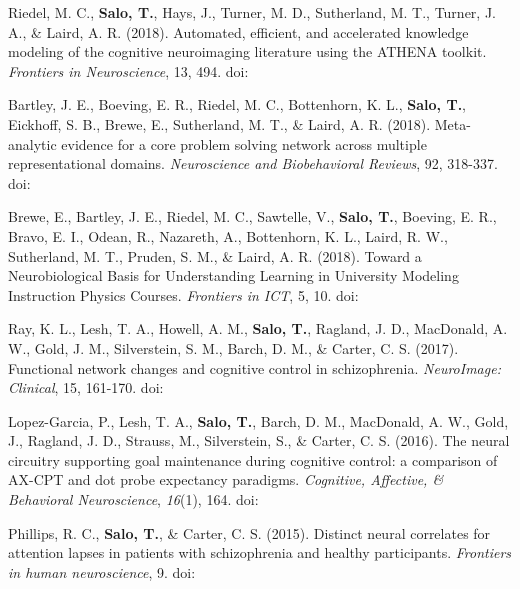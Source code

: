 \documentclass[10pt]{article}
\newcommand{\textlink}[3][blue]{\href{#2}{\color{#1}{#3}}}
\begin{document}
\begin{hangparas}{.25in}{1}

	Riedel, M. C., \textbf{Salo, T.}, Hays, J., Turner, M. D., Sutherland, M. T.,
	Turner, J. A., \& Laird, A. R. (2018).
	Automated, efficient, and accelerated knowledge modeling of the cognitive
	neuroimaging literature using the ATHENA toolkit.
	\emph{Frontiers in Neuroscience}, 13, 494.
	doi:\textlink{https://doi.org/10.3389/fnins.2019.00494}{10.3389/fnins.2019.00494}

	\bigskip

	Bartley, J. E., Boeving, E. R., Riedel, M. C., Bottenhorn, K. L.,
	\textbf{Salo, T.}, Eickhoff, S. B., Brewe, E., Sutherland, M. T.,
	\& Laird, A. R. (2018).
	Meta-analytic evidence for a core problem solving network across multiple
	representational domains. \emph{Neuroscience and Biobehavioral Reviews}, 92, 318-337.
	doi:\textlink{https://doi.org/10.1016/j.neubiorev.2018.06.009}{10.1016/j.neubiorev.2018.06.009}

	\bigskip

	Brewe, E., Bartley, J. E., Riedel, M. C., Sawtelle, V., \textbf{Salo, T.},
	Boeving, E. R., Bravo, E. I., Odean, R., Nazareth, A., Bottenhorn, K. L.,
	Laird, R. W., Sutherland, M. T., Pruden, S. M., \& Laird, A. R. (2018).
	Toward a Neurobiological Basis for Understanding Learning in University Modeling
	Instruction Physics Courses. \emph{Frontiers in ICT}, 5, 10.
	doi:\textlink{https://doi.org/10.3389/fict.2018.00010}{10.3389/fict.2018.00010}

	\bigskip

	Ray, K. L., Lesh, T. A., Howell, A. M., \textbf{Salo, T.}, Ragland, J. D.,
	MacDonald, A. W., Gold, J. M., Silverstein, S. M., Barch, D. M., \& Carter,
	C. S. (2017). Functional network changes and cognitive control in schizophrenia.
	\emph{NeuroImage: Clinical}, 15, 161-170.
	doi:\textlink{https://doi.org/10.1016/j.nicl.2017.05.001}{10.1016/j.nicl.2017.05.001}

	\bigskip

	Lopez-Garcia, P., Lesh, T. A., \textbf{Salo, T.}, Barch, D. M., MacDonald,
	A. W., Gold, J., Ragland, J. D., Strauss, M., Silverstein, S., \& Carter, C. S.
	(2016). The neural circuitry supporting goal maintenance during cognitive
	control: a comparison of AX-CPT and dot probe expectancy paradigms.
	\emph{Cognitive, Affective, \& Behavioral Neuroscience}, \emph{16}(1), 164.
	doi:\textlink{https://doi.org/10.3758/s13415-015-0384-1}{10.3758/s13415-015-0384-1}

	\bigskip

	Phillips, R. C., \textbf{Salo, T.}, \& Carter, C. S. (2015). Distinct neural
	correlates for attention lapses in patients with schizophrenia and healthy
	participants. \emph{Frontiers in human neuroscience}, 9.
	doi:\textlink{https://doi.org/10.3389/fnhum.2015.00502}{10.3389/fnhum.2015.00502}

\end{hangparas}
\end{document}
